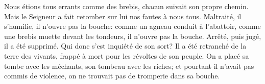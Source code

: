 Nous étions tous errants comme des brebis, chacun suivait son propre chemin.
	Mais le Seigneur a fait retomber sur lui nos fautes à nous tous.
Maltraité, il s’humilie, il n’ouvre pas la bouche:
	comme un agneau conduit à l’abattoir, comme une brebis muette devant les tondeurs,
	il n’ouvre pas la bouche.
Arrêté, puis jugé, il a été supprimé.
	Qui donc s’est inquiété de son sort?
Il a été retranché de la terre des vivants,
	frappé à mort pour les révoltes de son peuple.
On a placé sa tombe avec les méchants, son tombeau avec les riches;
	et pourtant il n’avait pas commis de violence,
	on ne trouvait pas de tromperie dans sa bouche.
